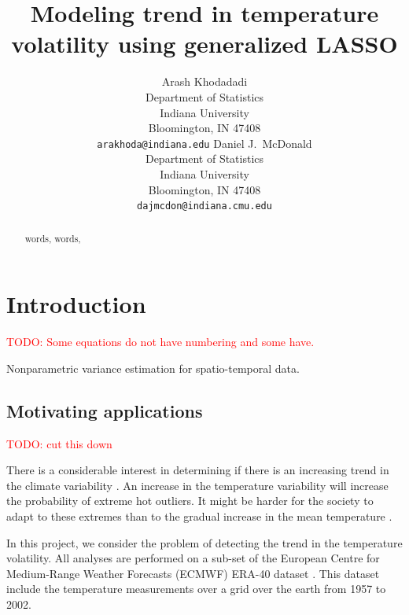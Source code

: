 \documentclass{article}
\title{Modeling trend in temperature volatility using generalized LASSO}
\author{Arash Khodadadi\\
 Department of Statistics\\
 Indiana University\\
 Bloomington, IN 47408 \\
 \texttt{arakhoda@indiana.edu}
\And
  Daniel J.\ McDonald \\
 Department of Statistics\\
 Indiana University\\
 Bloomington, IN 47408 \\
 \texttt{dajmcdon@indiana.cmu.edu}}
\newcommand{\attn}[1]{\textcolor{red}{TODO: #1}}
\begin{document}
 


\maketitle


\begin{abstract}
words, words,

\end{abstract}



\section{Introduction}

\attn{Some equations do not have numbering and some have.}

Nonparametric variance estimation for spatio-temporal data.

\subsection{Motivating applications}

\attn{cut this down}

There is a considerable interest in determining if there is an
increasing trend in the climate variability
\citep{hansen_perception_2012,huntingford_no_2013}. An increase in the
temperature variability will increase the probability of extreme hot
outliers. It might be harder for the society to adapt to these
extremes than to the gradual increase in the mean temperature
\citep{huntingford_no_2013}. 

In this project, we consider the problem of detecting the trend in the
temperature volatility. All analyses are performed on a sub-set of the
European Centre for Medium-Range Weather Forecasts (ECMWF) ERA-40
dataset \citep{uppala_era-40_2005}. This dataset include the
temperature measurements over a grid over the earth from 1957 to
2002.~\citep{VasseurDeLong2014,TrenberthZhang2014,StatenKahn2016,Screen2014,FischerBeyerle2013} 
\end{document}

